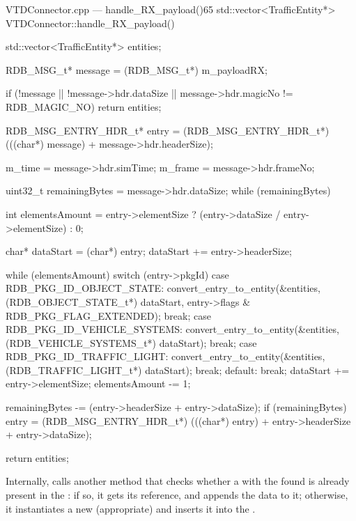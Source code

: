 \begin{codelist}{VTDConnector.cpp --- handle\_RX\_payload()}{65}
std::vector<TrafficEntity*> VTDConnector::handle_RX_payload() {
	std::vector<TrafficEntity*> entities;

	RDB_MSG_t* message = (RDB_MSG_t*) m_payloadRX;

	if (!message || !message->hdr.dataSize || message->hdr.magicNo != RDB_MAGIC_NO)
		return entities;

	RDB_MSG_ENTRY_HDR_t* entry = (RDB_MSG_ENTRY_HDR_t*) (((char*) message) + message->hdr.headerSize);

	m_time  = message->hdr.simTime;
	m_frame = message->hdr.frameNo;

	uint32_t remainingBytes = message->hdr.dataSize;
	while (remainingBytes) {
		int elementsAmount = entry->elementSize ? (entry->dataSize / entry->elementSize) : 0;

		char* dataStart = (char*) entry;
		dataStart += entry->headerSize;

		while (elementsAmount) {
			switch (entry->pkgId) {
				case RDB_PKG_ID_OBJECT_STATE:
					convert_entry_to_entity(&entities, (RDB_OBJECT_STATE_t*) dataStart, entry->flags & RDB_PKG_FLAG_EXTENDED);
					break;
				case RDB_PKG_ID_VEHICLE_SYSTEMS:
					convert_entry_to_entity(&entities, (RDB_VEHICLE_SYSTEMS_t*) dataStart);
					break;
				case RDB_PKG_ID_TRAFFIC_LIGHT:
					convert_entry_to_entity(&entities, (RDB_TRAFFIC_LIGHT_t*) dataStart);
					break;
				default:
					break;
			}
			dataStart += entry->elementSize;
			elementsAmount -= 1;
		}

		remainingBytes -= (entry->headerSize + entry->dataSize);
		if (remainingBytes)
			entry = (RDB_MSG_ENTRY_HDR_t*) (((char*) entry) + entry->headerSize + entry->dataSize);
	}

	return entities;
}
\end{codelist}

Internally,  calls another method that checks whether a  with the found  is already present in the : if so, it gets its reference, and appends the data to it; otherwise, it instantiates a new (appropriate)  and inserts it into the .

